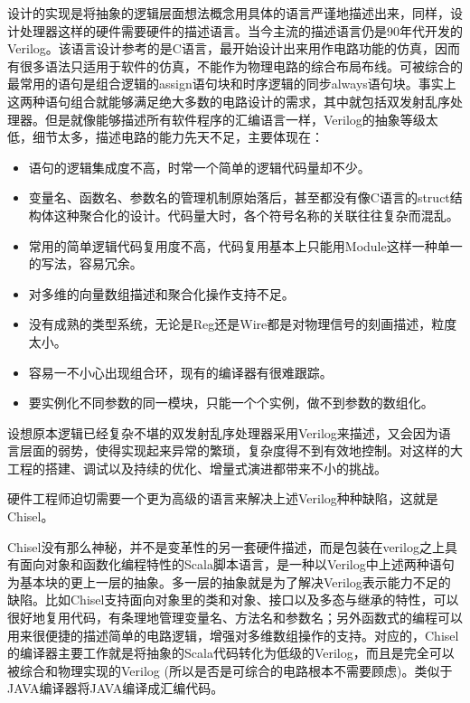 设计的实现是将抽象的逻辑层面想法概念用具体的语言严谨地描述出来，同样，设计处理器这样的硬件需要硬件的描述语言。当今主流的描述语言仍是90年代开发的Verilog。该语言设计参考的是C语言，最开始设计出来用作电路功能的仿真，因而有很多语法只适用于软件的仿真，不能作为物理电路的综合布局布线。可被综合的最常用的语句是组合逻辑的assign语句块和时序逻辑的同步always语句块。事实上这两种语句组合就能够满足绝大多数的电路设计的需求，其中就包括双发射乱序处理器。但是就像能够描述所有软件程序的汇编语言一样，Verilog的抽象等级太低，细节太多，描述电路的能力先天不足，主要体现在：
\begin{itemize}
	\item 语句的逻辑集成度不高，时常一个简单的逻辑代码量却不少。
	\item 变量名、函数名、参数名的管理机制原始落后，甚至都没有像C语言的struct结构体这种聚合化的设计。代码量大时，各个符号名称的关联往往复杂而混乱。
	\item 常用的简单逻辑代码复用度不高，代码复用基本上只能用Module这样一种单一的写法，容易冗余。
	\item 对多维的向量数组描述和聚合化操作支持不足。
	\item 没有成熟的类型系统，无论是Reg还是Wire都是对物理信号的刻画描述，粒度太小。
	\item 容易一不小心出现组合环，现有的编译器有很难跟踪。
	\item 要实例化不同参数的同一模块，只能一个个实例，做不到参数的数组化。
\end{itemize}

设想原本逻辑已经复杂不堪的双发射乱序处理器采用Verilog来描述，又会因为语言层面的弱势，使得实现起来异常的繁琐，复杂度得不到有效地控制。对这样的大工程的搭建、调试以及持续的优化、增量式演进都带来不小的挑战。

硬件工程师迫切需要一个更为高级的语言来解决上述Verilog种种缺陷，这就是Chisel。

Chisel没有那么神秘，并不是变革性的另一套硬件描述，而是包装在verilog之上具有面向对象和函数化编程特性的Scala脚本语言，是一种以Verilog中上述两种语句为基本块的更上一层的抽象。多一层的抽象就是为了解决Verilog表示能力不足的缺陷。比如Chisel支持面向对象里的类和对象、接口以及多态与继承的特性，可以很好地复用代码，有条理地管理变量名、方法名和参数名；另外函数式的编程可以用来很便捷的描述简单的电路逻辑，增强对多维数组操作的支持。对应的，Chisel的编译器主要工作就是将抽象的Scala代码转化为低级的Verilog，而且是完全可以被综合和物理实现的Verilog (所以是否是可综合的电路根本不需要顾虑)。类似于JAVA编译器将JAVA编译成汇编代码。

